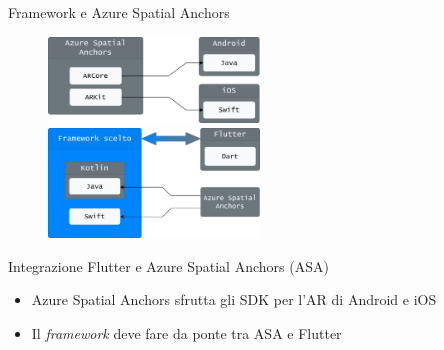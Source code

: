\documentclass{beamer}
\begin{document}
\begin{frame}{Framework e Azure Spatial Anchors}

 \begin{figure}
    \centering
    \includegraphics[width=0.5\textwidth]{immagini/tecASA.png}\vspace{2em}
    \includegraphics[width=0.5\textwidth]{immagini/aplug_linguaggi.png}
\end{figure}
Integrazione Flutter e Azure Spatial Anchors (ASA) \vspace{1em}

\begin{itemize}
    \item Azure Spatial Anchors sfrutta gli SDK per l'AR di Android e iOS \vspace{1em}
    \item Il \textit{framework} deve fare da ponte tra ASA e Flutter
\end{itemize}
\vspace{5em}
\end{frame}

\end{document}

